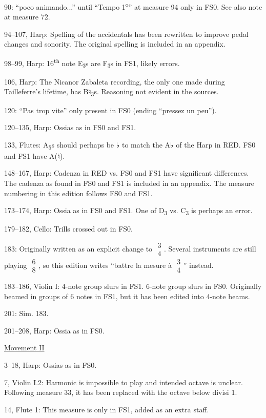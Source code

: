 \documentclass[twoside]{article}
\begin{document}
\begin{hangparas}{15pt}{1}
\begin{multicols}{2}
90: ``poco animando...'' until ``Tempo 1\textsuperscript{o}'' at measure 94 only in FS0. See also note at measure 72.

94--107, Harp: Spelling of the accidentals has been rewritten to improve pedal changes and sonority. The original spelling is included in an appendix.

98--99, Harp: 16\textsuperscript{th} note E\textsubscript{3}s are F\textsubscript{3}s in FS1, likely errors.

106, Harp: The Nicanor Zabaleta recording, the only one made during Tailleferre's lifetime, has B♮\textsubscript{3}s. Reasoning not evident in the sources.

120: ``Pas trop vite'' only present in FS0 (ending ``pressez un peu'').

120--135, Harp: Ossias as in FS0 and FS1.

133, Flutes: A\textsubscript{5}s should perhaps be ♭ to match the A♭ of the Harp in RED. FS0 and FS1 have A(♮).

148--167, Harp: Cadenza in RED vs. FS0 and FS1 have significant differences. The cadenza as found in FS0 and FS1 is included in an appendix. The measure numbering in this edition follows FS0 and FS1.

173--174, Harp: Ossia as in FS0 and FS1. One of D\textsubscript{3} vs. C\textsubscript{3} is perhaps an error.

179--182, Cello: Trills crossed out in FS0.

183: Originally written as an explicit change to $\substack{3\\4}$. Several instruments are still playing $\substack{6\\8}$, so this edition writes ``battre la mesure à $\substack{3\\4}$'' instead.

183--186, Violin I: 4-note group slurs in FS1. 6-note group slurs in FS0. Originally beamed in groups of 6 notes in FS1, but it has been edited into 4-note beams.

201: Sim. 183.

201--208, Harp: Ossia as in FS0.

\underline{Movement II}

3--18, Harp: Ossias as in FS0.

7, Violin I.2: Harmonic is impossible to play and intended octave is unclear. Following measure 33, it has been replaced with the octave below divisi 1.

14, Flute 1: This measure is only in FS1, added as an extra staff.


\end{multicols}
\end{hangparas}
\end{document}

